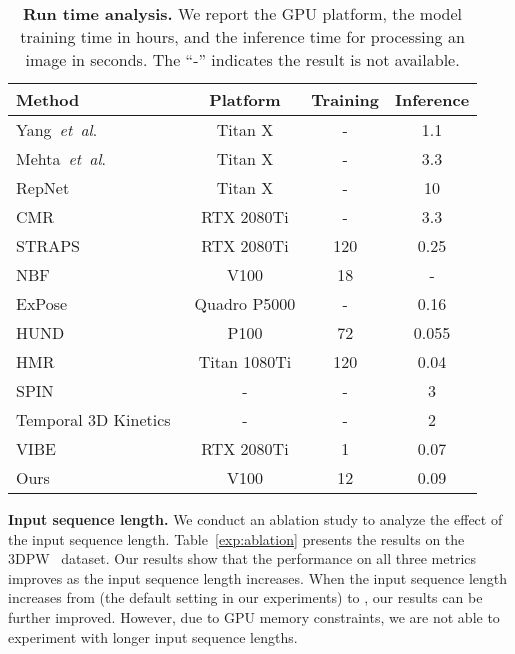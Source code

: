 \documentclass[times,referee,twocolumn,final,authoryear]{elsarticle}
\newcommand{\revised}[1]{{{#1}}}
\newcommand{\etal}{\textit{et~al}\mbox{.}}
\newcommand{\heading}[1]{\noindent\textbf{#1}}
\begin{document}
\begin{table}[t]
  \begin{center}
  \scriptsize
  \caption{
  \textbf{Run time analysis.}
\revised{
  We report the GPU platform, the model training time in hours, and the inference time for processing an image in seconds.
The ``-'' indicates the result is not available.
}
  }
  \vspace{-3.0mm}
  \label{exp:inference-time}
   \resizebox{\linewidth}{!} 
  {
  \begin{tabular}{l|ccc}
\toprule
Method & Platform & Training & Inference \\
\midrule
Yang~\etal~\citep{yang20183d} & Titan X & - & 1.1 \\
Mehta~\etal~\citep{mehta2017vnect} & Titan X & - & 3.3 \\
RepNet~\citep{wandt2019repnet} & Titan X & - & 10 \\
CMR~\citep{CMR} & RTX 2080Ti & - & 3.3 \\
STRAPS~\citep{sengupta2020synthetic} & RTX 2080Ti & 120 & 0.25 \\
NBF~\citep{omran2018neural} & V100 & 18 & - \\
ExPose~\citep{ExPose} & Quadro P5000 & - & 0.16 \\
HUND~\citep{zanfir2020neural} & P100 & 72 & 0.055 \\
HMR~\citep{HMR} & Titan 1080Ti & 120 & 0.04  \\
SPIN~\citep{SPIN} & - & - & 3 \\
\midrule
Temporal 3D Kinetics~\citep{Temporal3DKinetics} & - & - & 2 \\
VIBE~\citep{VIBE} & RTX 2080Ti & 1 & 0.07 \\
Ours & V100 & 12 & 0.09 \\
\bottomrule
\end{tabular}
  }
  \end{center}
  \vspace{-8.0mm}
\end{table}

\heading{Input sequence length.} 
We conduct an ablation study to analyze the effect of the input sequence length.
Table~\ref{exp:ablation} presents the results on the 3DPW~\citep{3DPW} dataset.
Our results show that the performance on all three metrics improves as the input sequence length increases.
When the input sequence length increases from  (the default setting in our experiments) to , our results can be further improved.
However, due to GPU memory constraints, we are not able to experiment with longer input sequence lengths.
\end{document}
